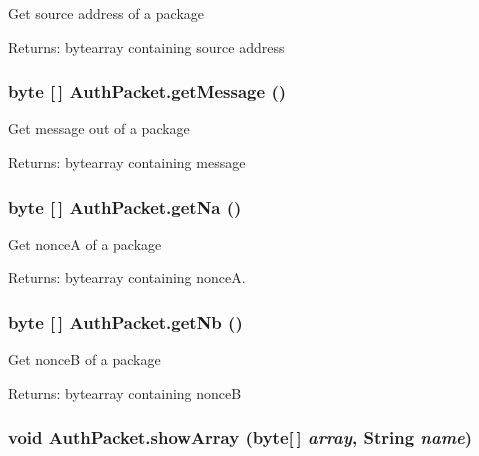 Get source address of a package \begin{Desc}
\item[Returns:]bytearray containing source address \end{Desc}
\hypertarget{class_auth_packet_c6}{
\subsubsection[getMessage]{\setlength{\rightskip}{0pt plus 5cm}byte \mbox{[}$\,$\mbox{]} Auth\-Packet.get\-Message ()}}
\label{class_auth_packet_c6}


Get message out of a package \begin{Desc}
\item[Returns:]bytearray containing message \end{Desc}
\hypertarget{class_auth_packet_c4}{
\subsubsection[getNa]{\setlength{\rightskip}{0pt plus 5cm}byte \mbox{[}$\,$\mbox{]} Auth\-Packet.get\-Na ()}}
\label{class_auth_packet_c4}


Get nonce\-A of a package \begin{Desc}
\item[Returns:]bytearray containing nonce\-A. \end{Desc}
\hypertarget{class_auth_packet_c5}{
\subsubsection[getNb]{\setlength{\rightskip}{0pt plus 5cm}byte \mbox{[}$\,$\mbox{]} Auth\-Packet.get\-Nb ()}}
\label{class_auth_packet_c5}


Get nonce\-B of a package \begin{Desc}
\item[Returns:]bytearray containing nonce\-B \end{Desc}
\hypertarget{class_auth_packet_c12}{
\subsubsection[showArray]{\setlength{\rightskip}{0pt plus 5cm}void Auth\-Packet.show\-Array (byte\mbox{[}$\,$\mbox{]} {\em array}, String {\em name})}}
\label{class_auth_packet_c12}


